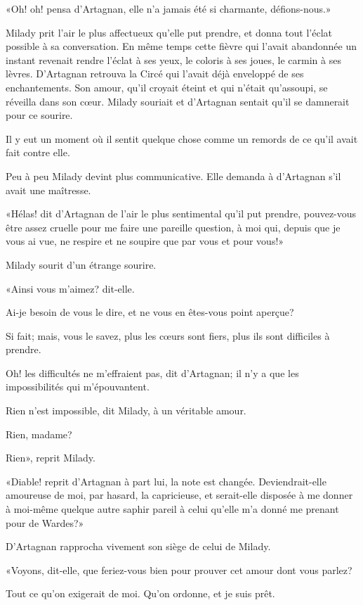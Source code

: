 «Oh! oh! pensa d'Artagnan, elle n'a jamais été si charmante, défions-nous.» 

Milady prit l'air le plus affectueux qu'elle put prendre, et donna tout l'éclat possible à sa conversation. En même temps cette fièvre qui l'avait abandonnée un instant revenait rendre l'éclat à ses yeux, le coloris à ses joues, le carmin à ses lèvres. D'Artagnan retrouva la Circé qui l'avait déjà enveloppé de ses enchantements. Son amour, qu'il croyait éteint et qui n'était qu'assoupi, se réveilla dans son cœur. Milady souriait et d'Artagnan sentait qu'il se damnerait pour ce sourire. 

Il y eut un moment où il sentit quelque chose comme un remords de ce qu'il avait fait contre elle. 

Peu à peu Milady devint plus communicative. Elle demanda à d'Artagnan s'il avait une maîtresse. 

«Hélas! dit d'Artagnan de l'air le plus sentimental qu'il put prendre, pouvez-vous être assez cruelle pour me faire une pareille question, à moi qui, depuis que je vous ai vue, ne respire et ne soupire que par vous et pour vous!» 

Milady sourit d'un étrange sourire. 

«Ainsi vous m'aimez? dit-elle. 

\speak  Ai-je besoin de vous le dire, et ne vous en êtes-vous point aperçue? 

\speak  Si fait; mais, vous le savez, plus les cœurs sont fiers, plus ils sont difficiles à prendre. 

\speak  Oh! les difficultés ne m'effraient pas, dit d'Artagnan; il n'y a que les impossibilités qui m'épouvantent. 

\speak  Rien n'est impossible, dit Milady, à un véritable amour. 

\speak  Rien, madame? 

\speak  Rien», reprit Milady. 

«Diable! reprit d'Artagnan à part lui, la note est changée. Deviendrait-elle amoureuse de moi, par hasard, la capricieuse, et serait-elle disposée à me donner à moi-même quelque autre saphir pareil à celui qu'elle m'a donné me prenant pour de Wardes?» 

D'Artagnan rapprocha vivement son siège de celui de Milady. 

«Voyons, dit-elle, que feriez-vous bien pour prouver cet amour dont vous parlez? 

\speak  Tout ce qu'on exigerait de moi. Qu'on ordonne, et je suis prêt. 

